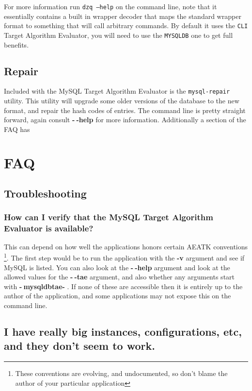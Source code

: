 \documentclass[11pt,letterpaper,oneside]{article}
\begin{document}
For more information run \texttt{dzq --help} on the command line, note that it essentially contains a built in wrapper decoder that maps the standard wrapper format to something that will call arbitrary commands. By default it uses the \texttt{CLI} Target Algorithm Evaluator, you will need to use the \texttt{MYSQLDB} one to get full benefits.

\subsection{Repair}

Included with the MySQL Target Algorithm Evaluator is the \texttt{mysql-repair} utility. This utility will upgrade some older versions of the database to the new format, and repair the hash codes of entries. The command line is pretty straight forward, again consult \textbf{-$~\!$-help} for more information. Additionally a section of the FAQ has 

\section{FAQ}

\subsection{Troubleshooting}

\subsubsection{How can I verify that the MySQL Target Algorithm Evaluator is available?}
\label{faq:verify}

This can depend on how well the applications honors certain AEATK conventions \footnote{These conventions are evolving, and undocumented, so don't blame the author of your particular application }. The first step would be to run the application with the \textbf{-v} argument and see if MySQL is listed. You can also look at the \textbf{-$~\!$-help} argument and look at the allowed values for the \textbf{-$~\!$-tae} argument, and also whether any arguments start with \textbf{-$~\!$mysqldbtae-} . If none of these are accessible then it is entirely up to the author of the application, and some applications may not expose this on the command line.

\subsection{I have really big instances, configurations, etc, and they don't seem to work.}
\label{big}
\end{document}
